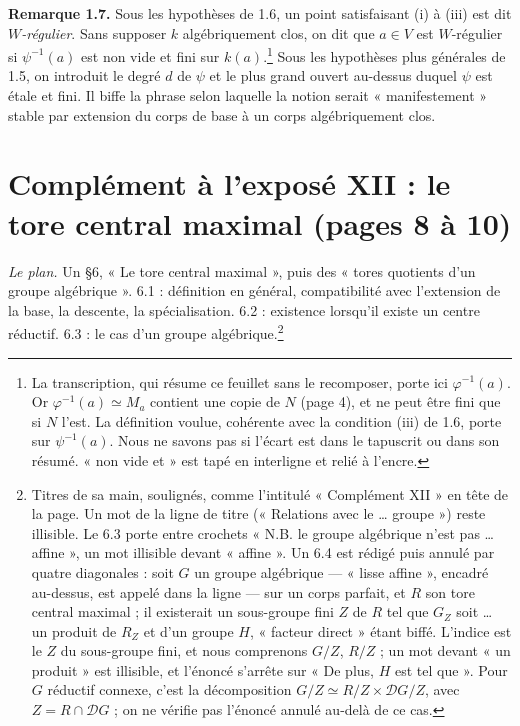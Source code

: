 \documentclass[11pt,a4paper]{article}
\begin{document}
\textbf{Remarque 1.7.} Sous les hypothèses de 1.6, un point satisfaisant (i)
à (iii) est dit \emph{$W$-régulier}. Sans supposer $k$ algébriquement clos, on
dit que $a \in V$ est $W$-régulier si $\psi^{-1}(a)$ est non vide et fini sur
$k(a)$.\footnote{La transcription, qui résume ce feuillet sans le recomposer,
porte ici $\varphi^{-1}(a)$. Or $\varphi^{-1}(a) \simeq M_{a}$ contient une
copie de $N$ (page 4), et ne peut être fini que si $N$ l'est. La définition
voulue, cohérente avec la condition (iii) de 1.6, porte sur $\psi^{-1}(a)$.
Nous ne savons pas si l'écart est dans le tapuscrit ou dans son résumé. « non
vide et » est tapé en interligne et relié à l'encre.} Sous les hypothèses plus
générales de 1.5, on introduit le degré $d$ de $\psi$ et le plus grand ouvert
au-dessus duquel $\psi$ est étale et fini. Il biffe la phrase selon laquelle
la notion serait « manifestement » stable par extension du corps de base à un
corps algébriquement clos.

\section*{Complément à l'exposé XII : le tore central maximal (pages 8 à 10)}

\emph{Le plan.} Un §6, « Le tore central maximal », puis des « tores quotients
d'un groupe algébrique ». 6.1 : définition en général, compatibilité avec
l'extension de la base, la descente, la spécialisation. 6.2 : existence
lorsqu'il existe un centre réductif. 6.3 : le cas d'un groupe
algébrique.\footnote{Titres de sa main, soulignés, comme
l'intitulé « Complément XII » en tête de la page. Un mot de la ligne de titre
(« Relations avec le … groupe ») reste illisible. Le 6.3 porte entre crochets
« N.B. le groupe algébrique n'est pas … affine », un mot illisible devant
« affine ». Un 6.4 est rédigé puis annulé par quatre diagonales : soit $G$ un
groupe algébrique --- « lisse affine », encadré au-dessus, est appelé dans la
ligne --- sur un corps parfait, et $R$ son tore central maximal ; il
existerait un sous-groupe fini $Z$ de $R$ tel que $G_{Z}$ soit … un produit de
$R_{Z}$ et d'un groupe $H$, « facteur direct » étant biffé. L'indice est le
$Z$ du sous-groupe fini, et nous comprenons $G/Z$, $R/Z$ ; un mot devant « un
produit » est illisible, et l'énoncé s'arrête sur « De plus, $H$ est tel
que ». Pour $G$ réductif connexe, c'est la décomposition
$G/Z \simeq R/Z \times \mathcal{D}G/Z$, avec $Z = R \cap \mathcal{D}G$ ; on ne
vérifie pas l'énoncé annulé au-delà de ce cas.}
\end{document}
